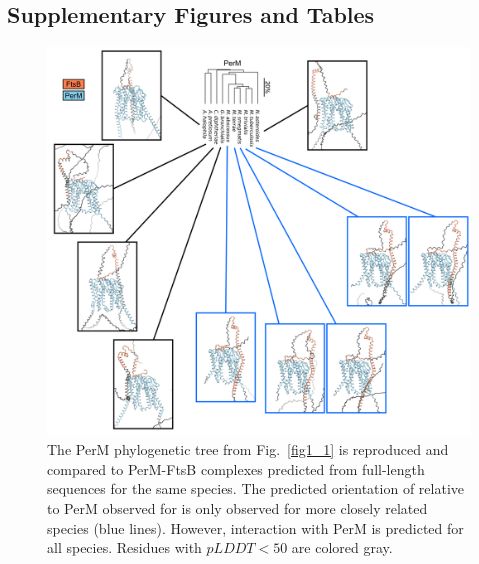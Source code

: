 \documentclass[pdflatex,sn-basic]{sn-jnl}%
\begin{document}
\begin{appendices}

\section{Supplementary Figures and Tables}

\begin{figure}[h]
\centering
\includegraphics[width=1.0\textwidth]{../figures/figS1.png}
\caption{The PerM phylogenetic tree from Fig.~\ref{fig1_1} is reproduced and compared to PerM-FtsB complexes predicted from full-length sequences for the same species. The predicted orientation of \ftsbTM{} relative to PerM observed for \mtb{} is only observed for more closely related species (blue lines). However, \ftsbH{} interaction with PerM is predicted for all species. Residues with $pLDDT<50$ are colored gray.}\label{figS1}
\end{figure}

\end{appendices}
\end{document}
